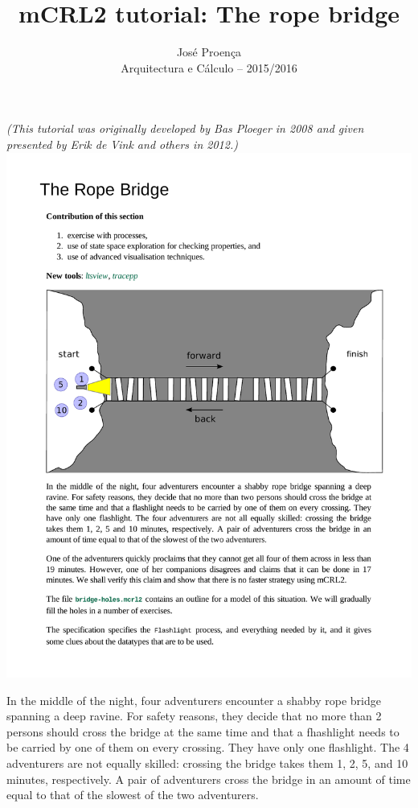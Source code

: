 \documentclass[11pt]{article}
\theoremstyle{myplain}
\theoremstyle{definition} %
\begin{document}
 
 
\title{mCRL2 tutorial: The rope bridge}
\author{Jos\'{e} Proen\c{c}a\\
Arquitectura e C\'alculo -- 2015/2016} 
 
\maketitle

\noindent
\emph{(This tutorial was originally developed by Bas Ploeger in 2008 and given presented by Erik de Vink and others in 2012.)}
\\[3mm]
%
\includegraphics[width=\textwidth]{images/ropebridge-diag}


In the middle of the night, four adventurers encounter a shabby rope bridge spanning a deep ravine. For safety reasons, they decide that no more than 2 persons should cross the bridge at the same time and that a fhashlight needs to be carried by one of them on every crossing.
They have only one flashlight. The 4 adventurers are not equally skilled: crossing the bridge takes them 1, 2, 5, and 10 minutes, respectively. A pair of adventurers cross the bridge in an amount of time equal to that of the slowest of the two adventurers.
\end{document}
